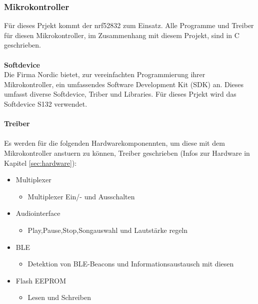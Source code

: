 \documentclass[10pt,a4paper,oneside]{99_fhnwreport}
\begin{document}
\subsubsection{Mikrokontroller}
Für dieses Prjekt kommt der nrf52832 zum Einsatz. Alle Programme und Treiber für diesen Mikrokontroller, im Zusammenhang mit diesem Projekt, sind in C geschrieben.\\
\\
\textbf{Softdevice}\\
Die Firma Nordic bietet, zur vereinfachten Programmierung ihrer Mikrokontroller, ein umfassendes Software Development Kit (SDK) an. Dieses umfasst diverse Softdevice, Triber und Libraries. Für dieses Prjekt wird das Softdevice S132 verwendet.\\
\\
\textbf{Treiber}\\
\\
Es werden für die folgenden Hardwarekomponennten, um diese mit dem Mikrokontroller anstuern zu können, Treiber geschrieben (Infos zur Hardware in Kapitel \ref{sec:hardware}):
\begin{itemize}
	\item{Multiplexer}
	\begin{itemize}
		\item{Multiplexer Ein/- und Ausschalten}
	\end{itemize}
\end{itemize}

\begin{itemize}
	\item{Audiointerface}
	\begin{itemize}
		\item{Play,Pause,Stop,Songauswahl und Lautstärke regeln}
	\end{itemize}
\end{itemize}

\begin{itemize}
	\item{BLE}
	\begin{itemize}
		\item{Detektion von BLE-Beacons und Informationsaustausch mit diesen}
	\end{itemize}
\end{itemize}

\begin{itemize}
	\item{Flash EEPROM}
	\begin{itemize}
		\item{Lesen und Schreiben}
	\end{itemize}
\end{itemize}
\end{document}
